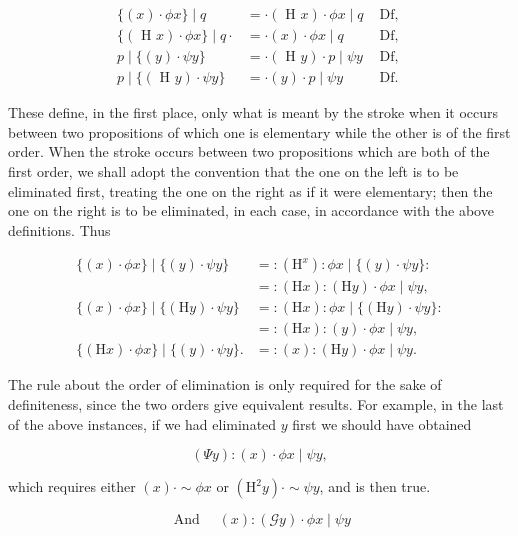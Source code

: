 \documentclass[10pt]{article}
\begin{document}
$$
\begin{array}{rlr}
\{(x) \cdot \phi x\} \mid q & =\cdot(\text { H } x) \cdot \phi x \mid q & \text { Df, } \\
\{(\text { H } x) \cdot \phi x\} \mid q \cdot & =\cdot(x) \cdot \phi x \mid q & \text { Df, } \\
p \mid\{(y) \cdot \psi y\} & =\cdot(\text { H } y) \cdot p \mid \psi y & \text { Df, } \\
p \mid\{(\text { H } y) \cdot \psi y\} & =\cdot(y) \cdot p \mid \psi y & \text { Df. }
\end{array}
$$

These define, in the first place, only what is meant by the stroke when it occurs between two propositions of which one is elementary while the other is of the first order. When the stroke occurs between two propositions which are both of the first order, we shall adopt the convention that the one on the left is to be eliminated first, treating the one on the right as if it were elementary; then the one on the right is to be eliminated, in each case, in accordance with the above definitions. Thus

$$
\begin{aligned}
\{(x) \cdot \phi x\} \mid\{(y) \cdot \psi y\} & =:\left(\mathrm{H}^{x}\right): \phi x \mid\{(y) \cdot \psi y\}: \\
& =:(\mathrm{H} x):(\mathrm{H} y) \cdot \phi x \mid \psi y, \\
\{(x) \cdot \phi x\} \mid\{(\mathrm{H} y) \cdot \psi y\} & =:(\mathrm{H} x): \phi x \mid\{(\mathrm{H} y) \cdot \psi y\}: \\
& =:(\mathrm{H} x):(y) \cdot \phi x \mid \psi y, \\
\{(\mathrm{H} x) \cdot \phi x\} \mid\{(y) \cdot \psi y\} . & =:(x):(\mathrm{H} y) \cdot \phi x \mid \psi y .
\end{aligned}
$$

The rule about the order of elimination is only required for the sake of definiteness, since the two orders give equivalent results. For example, in the last of the above instances, if we had eliminated $y$ first we should have obtained

$$
(\Psi y):(x) \cdot \phi x \mid \psi y,
$$

which requires either $(x) \cdot \sim \phi x$ or $\left(\mathrm{H}^{2} y\right) \cdot \sim \psi y$, and is then true.

$$
\text { And } \quad(x):(\mathcal{G} y) \cdot \phi x \mid \psi y
$$
\end{document}
